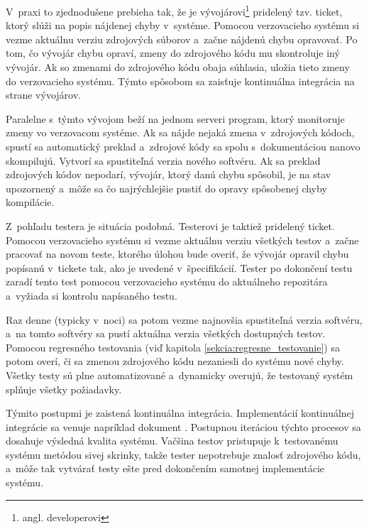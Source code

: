 V~praxi to zjednodušene prebieha tak, že je vývojárovi\footnote{angl. developerovi}
pridelený tzv. ticket, ktorý slúži na popis nájdenej chyby v~systéme. 
Pomocou verzovacieho systému si vezme aktuálnu verziu zdrojových súborov 
a~začne nájdenú chybu opravovať.
Po tom, čo vývojár chybu opraví, zmeny do zdrojového kódu mu skontroluje 
iný vývojár. Ak so zmenami do zdrojového kódu obaja súhlasia, uložia 
tieto zmeny do verzovacieho systému. Týmto spôsobom sa zaisťuje 
kontinuálna integrácia na strane vývojárov.

Paralelne s~týmto vývojom beží na jednom serveri program, ktorý 
monitoruje zmeny vo verzovacom systéme. Ak sa nájde nejaká zmena 
v~zdrojových kódoch, spustí sa automatický preklad a~zdrojové kódy sa 
spolu s~dokumentáciou nanovo skompilujú. Vytvorí sa spustiteľná verzia 
nového softvéru. Ak sa preklad zdrojových kódov nepodarí, vývojár, ktorý 
danú chybu spôsobil, je na stav upozornený a~môže sa čo najrýchlejšie 
pustiť do opravy spôsobenej chyby kompilácie.

Z~pohľadu testera je situácia podobná. Testerovi je taktiež pridelený 
ticket. Pomocou verzovacieho systému si vezme aktuálnu verziu
všetkých testov a~začne pracovať na novom teste, ktorého úlohou bude overiť, že vývojár 
opravil chybu popísanú v~tickete tak, ako je uvedené v~špecifikácií.
Tester po dokončení testu zaradí tento test pomocou verzovacieho 
systému do aktuálneho repozitára a~vyžiada si kontrolu napísaného testu. 

Raz denne (typicky v~noci) sa potom vezme najnovšia spustiteľná verzia 
softvéru, a~na tomto softvéry sa pustí aktuálna verzia všetkých dostupných 
testov. Pomocou regresného testovania 
(viď kapitola \ref{sekcia:regresne_testovanie}) sa potom overí, či sa 
zmenou zdrojového kódu nezaniesli do systému nové chyby. 
Všetky testy sú plne automatizované a~dynamicky overujú, že testovaný 
systém splňuje všetky požiadavky.

Týmito postupmi je zaistená kontinuálna integrácia. 
Implementácií kontinuálnej integrácie sa venuje napríklad dokument 
\cite{Continuous_integration_implementation}. 
Postupnou iteráciou týchto procesov sa dosahuje výsledná kvalita systému. 
Vačšina testov pristupuje k~testovanému systému metódou sivej skrinky, 
takže tester nepotrebuje znalosť zdrojového kódu, a~môže tak vytvárať 
testy ešte pred dokončením samotnej implementácie systému. 

